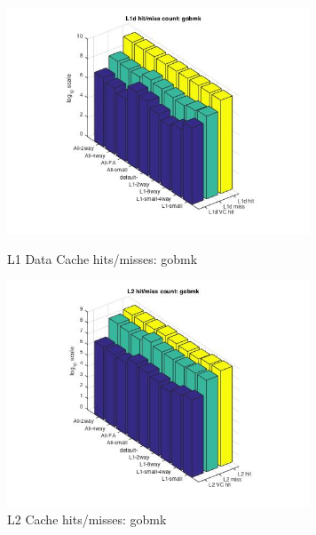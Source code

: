 \documentclass[11pt,titlepage]{article}
\begin{document}
        \begin{figure}[H]
          \centering
          \begin{minipage}{.45\textwidth}
            \includegraphics[width=9cm]{L1DHM_gobmk}
            \caption{L1 Data Cache hits/misses: gobmk}
            \label{fig:L1DHM_gobmk}
          \end{minipage}
          \begin{minipage}{.45\textwidth}
            \includegraphics[width=9cm]{L2HM_gobmk}
            \caption{L2 Cache hits/misses: gobmk}
            \label{fig:L2HM_gobmk}
          \end{minipage}
	\end{figure}
   
\end{document}
